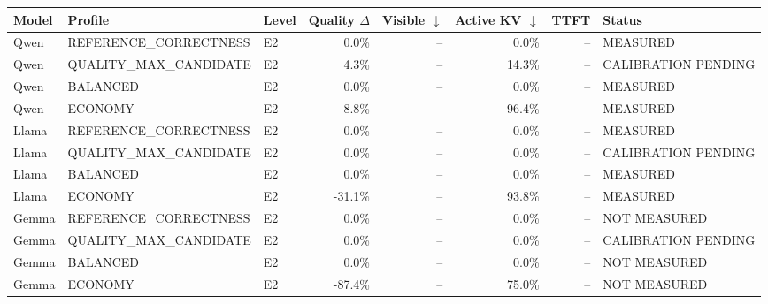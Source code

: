 \begin{tabular}{lllrrrrl}
\toprule
Model & Profile & Level & Quality $\Delta$ & Visible $\downarrow$ & Active KV $\downarrow$ & TTFT & Status \\
\midrule
Qwen & REFERENCE\_CORRECTNESS & E2 & 0.0\% & -- & 0.0\% & -- & MEASURED \\
Qwen & QUALITY\_MAX\_CANDIDATE & E2 & 4.3\% & -- & 14.3\% & -- & CALIBRATION PENDING \\
Qwen & BALANCED & E2 & 0.0\% & -- & 0.0\% & -- & MEASURED \\
Qwen & ECONOMY & E2 & -8.8\% & -- & 96.4\% & -- & MEASURED \\
Llama & REFERENCE\_CORRECTNESS & E2 & 0.0\% & -- & 0.0\% & -- & MEASURED \\
Llama & QUALITY\_MAX\_CANDIDATE & E2 & 0.0\% & -- & 0.0\% & -- & CALIBRATION PENDING \\
Llama & BALANCED & E2 & 0.0\% & -- & 0.0\% & -- & MEASURED \\
Llama & ECONOMY & E2 & -31.1\% & -- & 93.8\% & -- & MEASURED \\
Gemma & REFERENCE\_CORRECTNESS & E2 & 0.0\% & -- & 0.0\% & -- & NOT MEASURED \\
Gemma & QUALITY\_MAX\_CANDIDATE & E2 & 0.0\% & -- & 0.0\% & -- & CALIBRATION PENDING \\
Gemma & BALANCED & E2 & 0.0\% & -- & 0.0\% & -- & NOT MEASURED \\
Gemma & ECONOMY & E2 & -87.4\% & -- & 75.0\% & -- & NOT MEASURED \\
\bottomrule
\end{tabular}
